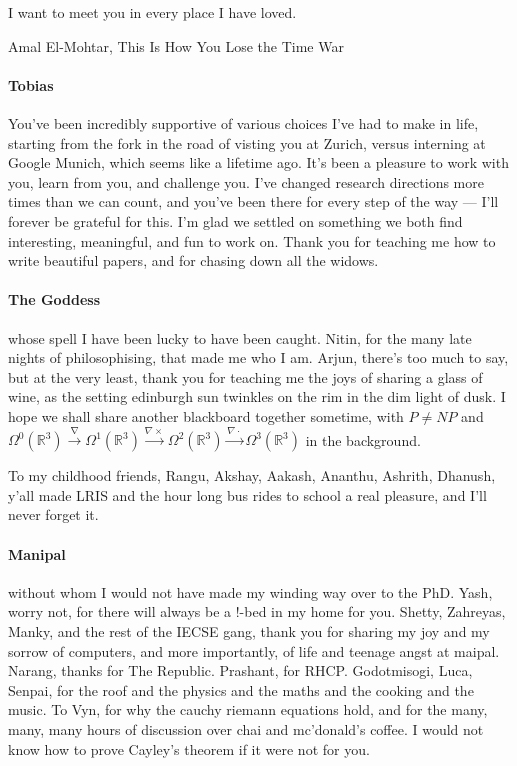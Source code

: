 \epigraph{I want to meet you in every place I have loved.}{Amal El-Mohtar, This Is How You Lose the Time War}

\paragraph{Tobias} %
You've been incredibly supportive of various choices I've had to make in life,
starting from the fork in the road of visting you at Zurich, versus interning at Google Munich, which seems like a lifetime ago.
It's been a pleasure to work with you, learn from you, and challenge you.
I've changed research directions more times than we can count,
and you've been there for every step of the way --- I'll forever be grateful for this.
I'm glad we settled on something we both find interesting, meaningful, and fun to work on.
Thank you for teaching me how to write beautiful papers, and for chasing down all the \linebreak widows.

\paragraph{The Goddess} whose spell I have been lucky to have been caught.
Nitin, for the many late nights of philosophising, that made me who I am.
Arjun, there's too much to say,
but at the very least, thank you for teaching me the joys of sharing a glass of wine,
as the setting edinburgh sun twinkles on the rim in the dim light of dusk.
I hope we shall share another blackboard together sometime, with $P \neq NP$ and $\Omega^0(\mathbb R^3) \xrightarrow{\nabla} \Omega^1(\mathbb R^3) \xrightarrow{\nabla \times} \Omega^2(\mathbb R^3) \xrightarrow{\nabla \cdot} \Omega^3(\mathbb R^3)$ in the background.

To my childhood friends, Rangu, Akshay, Aakash, Ananthu, Ashrith, Dhanush,
y'all made LRIS and the hour long bus rides to school a real pleasure,
and I'll never forget it.
%


\paragraph{Manipal}
without whom I would not have made my winding way over to the PhD.
Yash, worry not, for there will always be a !-bed in my home for you.
Shetty, Zahreyas, Manky, and the rest of the IECSE gang, thank you for sharing my joy and my sorrow of computers,
and more importantly, of life and teenage angst at maipal.
Narang, thanks for The Republic. Prashant, for RHCP. 
Godotmisogi, Luca, Senpai, for the roof and the physics and the maths and the cooking and the music.
To Vyn, for why the cauchy riemann equations hold, and for the many, many,
many hours of discussion over chai and mc'donald's coffee.
I would not know how to prove Cayley's theorem if it were not for you.


